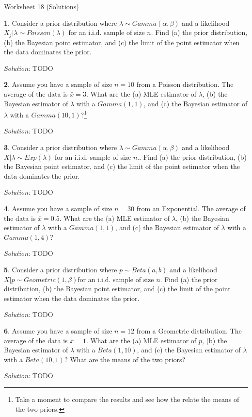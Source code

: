 \documentclass{tufte-handout}
\begin{document}
\justify

{\LARGE Worksheet 18 (Solutions)}

\vspace*{18pt}


\textbf{1}. Consider a prior distribution where $\lambda \sim Gamma(\alpha, \beta)$ and a 
likelihood $X_j|\lambda \sim Poisson(\lambda)$ for an i.i.d. sample of size $n$.
Find (a) the prior distribution, (b) the Bayesian point estimator, and (c) the
limit of the point estimator when the data dominates the prior.

\textit{Solution:} TODO

\textbf{2}. Assume you have a sample of size $n = 10$ from a Poisson distribution. The 
average of the data is $\bar{x} = 3$. What are the (a) MLE estimator of $\lambda$,
(b) the Bayesian estimator of $\lambda$ with a $Gamma(1, 1)$, and (c) the
Bayesian estimator of $\lambda$ with a $Gamma(10, 1)$?\footnote{
  Take a moment to compare the results and see how the relate the means of the
  two priors.
}

\textit{Solution:} TODO

\textbf{3}. Consider a prior distribution where $\lambda \sim Gamma(\alpha, \beta)$ and a 
likelihood $X|\lambda \sim Exp(\lambda)$ for an i.i.d. sample of size $n$..
Find (a) the prior distribution, (b) the Bayesian point estimator, and (c) the
limit of the point estimator when the data dominates the prior.

\textit{Solution:} TODO

\textbf{4}. Assume you have a sample of size $n = 30$ from an Exponential. The 
average of the data is $\bar{x} = 0.5$. What are the (a) MLE estimator of $\lambda$,
(b) the Bayesian estimator of $\lambda$ with a $Gamma(1, 1)$, and (c) the
Bayesian estimator of $\lambda$ with a $Gamma(1, 4)$?

\textit{Solution:} TODO

\textbf{5}. Consider a prior distribution where $p \sim Beta(a, b)$ and a 
likelihood $X|p \sim Geometric(1, \beta)$for an i.i.d. sample of size $n$.
Find (a) the prior distribution, (b) the Bayesian point estimator, and (c) the
limit of the point estimator when the data dominates the prior.

\textit{Solution:} TODO

\textbf{6}. Assume you have a sample of size $n = 12$ from a Geometric distribution. The 
average of the data is $\bar{x} = 1$. What are the (a) MLE estimator of $p$,
(b) the Bayesian estimator of $\lambda$ with a $Beta(1, 10)$, and (c) the
Bayesian estimator of $\lambda$ with a $Beta(10, 1)$? What are the means of
the two priors?

\textit{Solution:} TODO
\end{document}
